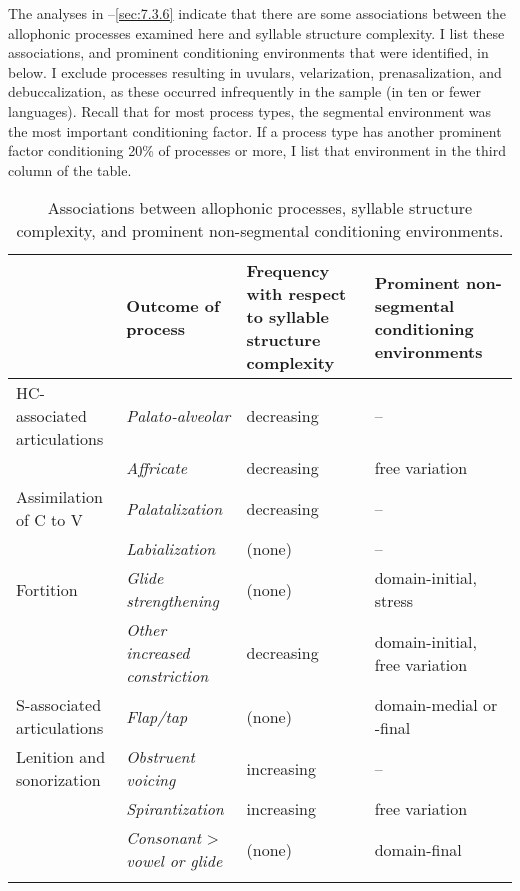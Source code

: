   The analyses in --\ref{sec:7.3.6} indicate that there are some associations between the allophonic processes examined here and syllable structure complexity. I list these associations, and prominent conditioning environments that were identified, in  below. I exclude processes resulting in uvulars, velarization, prenasalization, and debuccalization, as these occurred infrequently in the sample (in ten or fewer languages). Recall that for most process types, the segmental environment was the most important conditioning factor. If a process type has another prominent factor conditioning 20\% of processes or more, I list that environment in the third column of the table.

\begin{sidewaystable}
\begin{tabularx}{\textwidth}{lIQI}
\lsptoprule
 & Outcome of process &\hangindent=0pt Frequency with respect to syllable structure complexity &\hangindent=0pt Prominent non-segmental conditioning environments\\\midrule
HC-associated articulations & \textit{Palato-alveolar} & decreasing & --\\
 & \textit{Affricate} & decreasing & free variation\\\tablevspace
Assimilation of C to V & \textit{Palatalization} & decreasing & --\\
 & \textit{Labialization} & (none) & --\\\tablevspace
Fortition & \textit{Glide strengthening} & (none) & domain-initial, stress\\
& \textit{Other increased constriction} & decreasing & domain-initial, free variation\\\tablevspace
S-associated articulations & \textit{Flap/tap} & (none) & domain-medial or -final\\\tablevspace
Lenition and sonorization & \textit{Obstruent voicing} & increasing & --\\
& \textit{Spirantization} & increasing & free variation\\
& \textit{Consonant} > \textit{vowel or glide} & (none) & domain-final\\
\lspbottomrule
\end{tabularx}
\caption{\label{tab:7.7}Associations between allophonic processes, syllable structure complexity, and prominent non-segmental conditioning environments.}
\end{sidewaystable}

